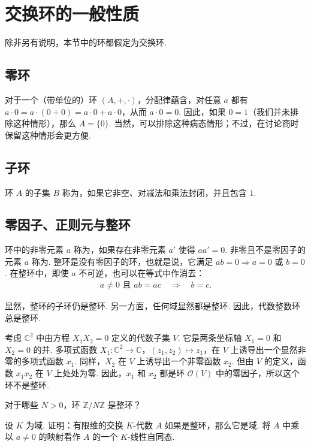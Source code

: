 \section{交换环的一般性质}\label{sec:galois-1-2}
除非另有说明，本节中的环都假定为交换环.

\subsection{零环}\label{sec:galois-1-2-1}
对于一个（带单位的）环 $(A,+,\cdot)$，分配律蕴含，对任意 $a$ 都有
$a\cdot0=a\cdot(0+0)=a\cdot0+a\cdot0$，从而 $a\cdot0=0$.
因此，如果 $0=1$（我们并未排除这种情形），那么 $A=\{0\}$.
当然，可以排除这种病态情形；不过，在讨论商时保留这种情形会更方便.

\subsection{子环}\label{sec:galois-1-2-2}
环 $A$ 的子集 $B$ 称为，如果它非空、对减法和乘法封闭，并且包含 $1$.

\subsection{零因子、正则元与整环}\label{sec:galois-1-2-3}
环中的非零元素 $a$ 称为，如果存在非零元素 $a'$ 使得 $aa'=0$.
非零且不是零因子的元素 $a$ 称为.
整环是没有零因子的环，也就是说，它满足 $ab=0\Rightarrow a=0\text{ 或 }b=0$.
在整环中，即使 $a$ 不可逆，也可以在等式中作消去：
\begin{align*}
a\ne0\text{ 且 }ab=ac\quad\Longrightarrow\quad b=c.
\end{align*}
\begin{example*}
显然，整环的子环仍是整环. 另一方面，任何域显然都是整环.
因此，代数整数环总是整环.
\end{example*}
\begin{example*}
考虑 $\mathbb C^2$ 中由方程 $X_1X_2=0$ 定义的代数子集 $V$.
它是两条坐标轴 $X_1=0$ 和 $X_2=0$ 的并.
多项式函数 $X_1:\mathbb C^2\longrightarrow\mathbb C$，$(z_1,z_2)\longmapsto z_1$，在 $V$ 上诱导出一个显然非零的多项式函数 $x_1$.
同样，$X_2$ 在 $V$ 上诱导出一个非零函数 $x_2$.
但由 $V$ 的定义，函数 $x_1x_2$ 在 $V$ 上处处为零.
因此，$x_1$ 和 $x_2$ 都是环 $\mathcal O(V)$ 中的零因子，所以这个环不是整环.
\end{example*}
\begin{exercise*}
对于哪些 $N>0$，环 $\mathbb Z/N\mathbb Z$ 是整环？
\end{exercise*}
\begin{exercise*}
设 $K$ 为域. 证明：有限维的交换 $K$-代数 $A$ 如果是整环，那么它是域.
将 $A$ 中乘以 $a\ne0$ 的映射看作 $A$ 的一个 $K$-线性自同态.
\end{exercise*}

